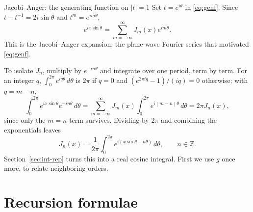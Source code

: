\documentclass[11pt]{beamer}
\begin{document}
\begin{frame}[allowframebreaks=1.00]{Jacobi--Anger: the generating function on $|t|=1$}
\footnotesize
Set $t=e^{i\theta}$ in \eqref{eq:genf}. Since $t-t^{-1}=2i\sin\theta$ and
$t^m=e^{im\theta}$,
\begin{equation}
 e^{ix\sin\theta}=\sum_{m=-\infty}^{\infty}J_m(x)e^{im\theta}.
 \label{eq:jacobi-anger}
\end{equation}
This is the Jacobi--Anger expansion, the plane-wave Fourier series that motivated
\eqref{eq:genf}.

To isolate $J_n$, multiply by $e^{-in\theta}$ and integrate over one period, term by
term. For an integer $q$, $\int_0^{2\pi}e^{iq\theta}\,d\theta$ is $2\pi$ if $q=0$ and
$(e^{2\pi iq}-1)/(iq)=0$ otherwise; with $q=m-n$,
\[
 \int_0^{2\pi}e^{ix\sin\theta}e^{-in\theta}\,d\theta
 =\sum_{m=-\infty}^{\infty}J_m(x)\int_0^{2\pi}e^{i(m-n)\theta}\,d\theta
 =2\pi J_n(x),
\]
since only the $m=n$ term survives. Dividing by $2\pi$ and combining the exponentials leaves
\begin{equation}
 J_n(x)=\frac1{2\pi}\int_0^{2\pi}
             e^{i(x\sin\theta-n\theta)}\,d\theta,\qquad n\in\mathbb Z.
 \label{eq:jacobi-anger-coefficient}
\end{equation}
Section~\ref{sec:int-rep} turns this into a real cosine integral. First we use $g$ once more, to
relate neighboring orders.
\end{frame}

\section{Recursion formulae}
\end{document}
